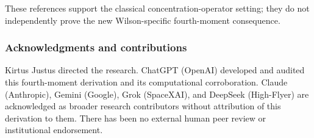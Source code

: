 \documentclass[
  10pt,
  a4paper,
]{article}
\begin{document}
These references support the classical concentration-operator setting; they do not independently prove the new Wilson-specific fourth-moment consequence.

\subsubsection{Acknowledgments and contributions}\label{acknowledgments-and-contributions}

Kirtus Justus directed the research. ChatGPT (OpenAI) developed and audited this fourth-moment derivation and its computational corroboration. Claude (Anthropic), Gemini (Google), Grok (SpaceXAI), and DeepSeek (High-Flyer) are acknowledged as broader research contributors without attribution of this derivation to them. There has been no external human peer review or institutional endorsement.
\end{document}
